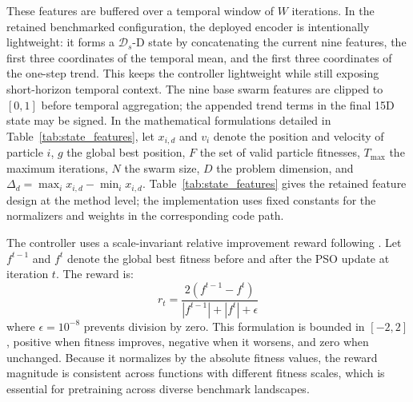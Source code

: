 \documentclass[final,5p,times]{elsarticle}
\newcommand{\symStatedim}{\mathcal{D}_s}
\newcommand{\symPopsize}{N}
\newcommand{\symMaxIters}{T_{\text{max}}}
\newcommand{\symWindowsize}{W}
\begin{document}
These features are buffered over a temporal window of $\symWindowsize$ iterations.
In the retained benchmarked configuration, the deployed encoder is intentionally lightweight: it forms a $\symStatedim$-D state by concatenating the current nine features, the first three coordinates of the temporal mean, and the first three coordinates of the one-step trend.
This keeps the controller lightweight while still exposing short-horizon temporal context.
The nine base swarm features are clipped to $[0,1]$ before temporal aggregation; the appended trend terms in the final 15D state may be signed.
In the mathematical formulations detailed in Table~\ref{tab:state_features}, let $x_{i,d}$ and $v_{i}$ denote the position and velocity of particle $i$, $g$ the global best position, $F$ the set of valid particle fitnesses, $\symMaxIters$ the maximum iterations, $\symPopsize$ the swarm size, $D$ the problem dimension, and $\Delta_d = \max_i x_{i,d} - \min_i x_{i,d}$.
Table~\ref{tab:state_features} gives the retained feature design at the method level; the implementation uses fixed constants for the normalizers and weights in the corresponding code path.

The controller uses a scale-invariant relative improvement reward following \cite{vonEschwege2024Soft}. Let $f^{t-1}$ and $f^{t}$ denote the global best fitness before and after the PSO update at iteration $t$. The reward is:
\begin{equation}
r_t = \frac{2\left(f^{t-1} - f^{t}\right)}{\left|f^{t-1}\right| + \left|f^{t}\right| + \epsilon}
\label{eq:reward_total}
\end{equation}
where $\epsilon = 10^{-8}$ prevents division by zero.
This formulation is bounded in $[-2, 2]$, positive when fitness improves, negative when it worsens, and zero when unchanged. Because it normalizes by the absolute fitness values, the reward magnitude is consistent across functions with different fitness scales, which is essential for pretraining across diverse benchmark landscapes.
\end{document}
